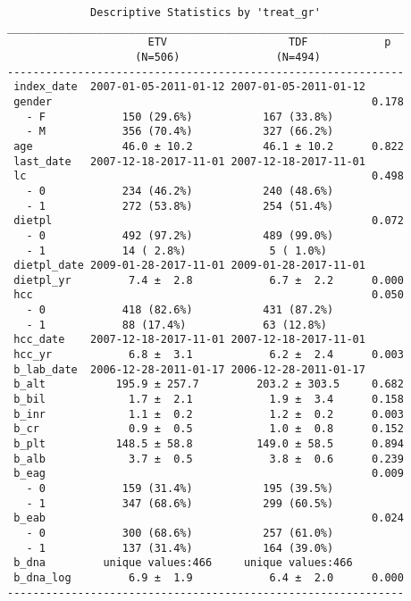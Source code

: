 \documentclass[
]{article}
\begin{document}
\begin{verbatim}
             Descriptive Statistics by 'treat_gr'            
______________________________________________________________ 
                      ETV                   TDF            p  
                    (N=506)               (N=494)       
-------------------------------------------------------------- 
 index_date  2007-01-05-2011-01-12 2007-01-05-2011-01-12      
 gender                                                  0.178
   - F            150 (29.6%)           167 (33.8%)           
   - M            356 (70.4%)           327 (66.2%)           
 age              46.0 ± 10.2           46.1 ± 10.2      0.822
 last_date   2007-12-18-2017-11-01 2007-12-18-2017-11-01      
 lc                                                      0.498
   - 0            234 (46.2%)           240 (48.6%)           
   - 1            272 (53.8%)           254 (51.4%)           
 dietpl                                                  0.072
   - 0            492 (97.2%)           489 (99.0%)           
   - 1            14 ( 2.8%)             5 ( 1.0%)            
 dietpl_date 2009-01-28-2017-11-01 2009-01-28-2017-11-01      
 dietpl_yr         7.4 ±  2.8            6.7 ±  2.2      0.000
 hcc                                                     0.050
   - 0            418 (82.6%)           431 (87.2%)           
   - 1            88 (17.4%)            63 (12.8%)            
 hcc_date    2007-12-18-2017-11-01 2007-12-18-2017-11-01      
 hcc_yr            6.8 ±  3.1            6.2 ±  2.4      0.003
 b_lab_date  2006-12-28-2011-01-17 2006-12-28-2011-01-17      
 b_alt           195.9 ± 257.7         203.2 ± 303.5     0.682
 b_bil             1.7 ±  2.1            1.9 ±  3.4      0.158
 b_inr             1.1 ±  0.2            1.2 ±  0.2      0.003
 b_cr              0.9 ±  0.5            1.0 ±  0.8      0.152
 b_plt           148.5 ± 58.8          149.0 ± 58.5      0.894
 b_alb             3.7 ±  0.5            3.8 ±  0.6      0.239
 b_eag                                                   0.009
   - 0            159 (31.4%)           195 (39.5%)           
   - 1            347 (68.6%)           299 (60.5%)           
 b_eab                                                   0.024
   - 0            300 (68.6%)           257 (61.0%)           
   - 1            137 (31.4%)           164 (39.0%)           
 b_dna         unique values:466     unique values:466        
 b_dna_log         6.9 ±  1.9            6.4 ±  2.0      0.000
-------------------------------------------------------------- 
\end{verbatim}
\end{document}
